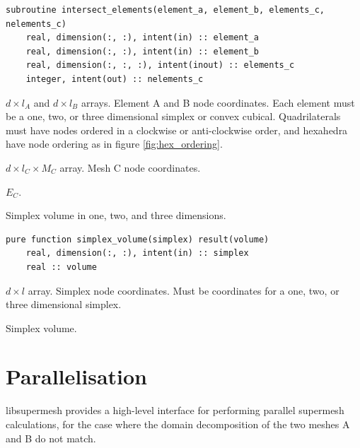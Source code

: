 \documentclass{article}
\begin{document}
\begin{lstlisting}[language=FORTRAN]
  subroutine intersect_elements(element_a, element_b, elements_c, nelements_c)
    real, dimension(:, :), intent(in) :: element_a
    real, dimension(:, :), intent(in) :: element_b
    real, dimension(:, :, :), intent(inout) :: elements_c
    integer, intent(out) :: nelements_c
\end{lstlisting}

\begin{description}[font=\ttfamily\bfseries,leftmargin=2.2\parindent,labelindent=1.7\parindent,noitemsep]
  \item[element\_a, element\_b] $d \times l_A$ and $d \times l_B$ arrays.
    Element A and B node coordinates. Each element must be a one, two, or three
    dimensional simplex or convex cubical. Quadrilaterals must have nodes
    ordered in a clockwise or anti-clockwise order, and hexahedra have node
    ordering as in figure \ref{fig:hex_ordering}.
  \item[elements\_c] $d \times l_C \times M_C$ array. Mesh C node coordinates.
  \item[n\_simplices\_c] $E_C$.
\end{description}

\noindent Simplex volume in one, two, and three dimensions.

\begin{lstlisting}[language=FORTRAN]
  pure function simplex_volume(simplex) result(volume)
    real, dimension(:, :), intent(in) :: simplex
    real :: volume
\end{lstlisting}

\begin{description}[font=\ttfamily\bfseries,leftmargin=2.2\parindent,labelindent=1.7\parindent,noitemsep]
  \item[simplex] $d \times l$ array. Simplex node coordinates. Must be
    coordinates for a one, two, or three dimensional simplex.
  \item[volume] Simplex volume.
\end{description}

\section{Parallelisation}

libsupermesh provides a high-level interface for performing parallel supermesh
calculations, for the case where the domain decomposition of the two meshes A
and B do not match. 
\end{document}
